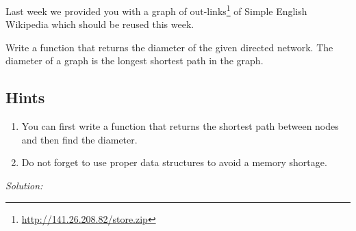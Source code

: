 \documentclass{WeSTassignment}
\begin{document}
Last week we provided you with a graph of out-links\footnote{\url{http://141.26.208.82/store.zip}} of Simple English Wikipedia which should be reused this week. 

Write a function that returns the %
diameter of the given directed network.
The %
diameter of a graph is the longest shortest path in the graph. 

\subsection{Hints}
\begin{enumerate}
\item You can first write a function that returns the shortest path between nodes and then find the %
diameter.
\item Do not forget to use proper data structures to avoid a memory shortage.  
\end{enumerate}

\emph{Solution: }


\makefooter
\end{document}
